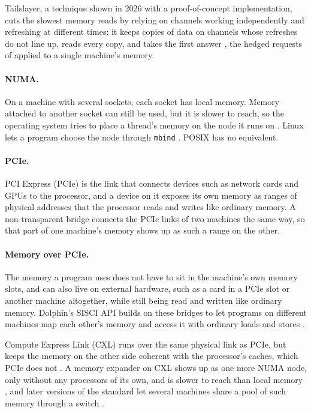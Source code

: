 \documentclass[12pt]{report}
\renewcommand{\_}{\origunderscore\allowbreak}
\begin{document}
Tailslayer, a technique shown in 2026 with a proof-of-concept implementation, cuts the slowest memory reads by relying on channels working independently and refreshing at different times: it keeps copies of data on channels whose refreshes do not line up, reads every copy, and takes the first answer \cite{tailslayer,lauriewired2026ram}, the hedged requests of \textcite{dean2013tail} applied to a single machine's memory.

\paragraph{NUMA.} On a machine with several sockets, each socket has local memory. Memory attached to another socket can still be used, but it is slower to reach, so the operating system tries to place a thread's memory on the node it runs on \cite{lameter2013numa}. Linux lets a program choose the node through \texttt{mbind} \cite{linux-mbind-man}. POSIX has no equivalent.

\paragraph{PCIe.} PCI Express (PCIe) is the link that connects devices such as network cards and GPUs to the processor, and a device on it exposes its own memory as ranges of physical addresses that the processor reads and writes like ordinary memory. A non-transparent bridge connects the PCIe links of two machines the same way, so that part of one machine's memory shows up as such a range on the other.

\paragraph{Memory over PCIe.} The memory a program uses does not have to sit in the machine's own memory slots, and can also live on external hardware, such as a card in a PCIe slot or another machine altogether, while still being read and written like ordinary memory. Dolphin's SISCI API builds on these bridges to let programs on different machines map each other's memory and access it with ordinary loads and stores \cite{dolphin-sisci}.

Compute Express Link (CXL) runs over the same physical link as PCIe, but keeps the memory on the other side coherent with the processor's caches, which PCIe does not \cite{sharma2024cxl}. A memory expander on CXL shows up as one more NUMA node, only without any processors of its own, and is slower to reach than local memory \cite{li2023pond}, and later versions of the standard let several machines share a pool of such memory through a switch \cite{sharma2024cxl,bratterud2026cxl}.
\end{document}
